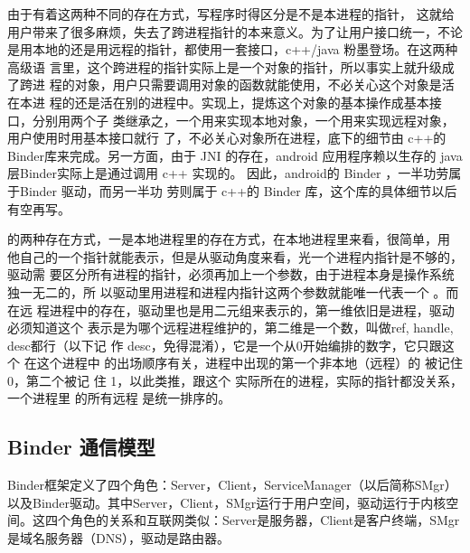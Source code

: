 \documentclass[a4paper,11pt]{article}
\begin{document}
由于\binder 有着这两种不同的存在方式，写程序时得区分\binder 是不是本进程的指针，
这就给用户带来了很多麻烦，失去了跨进程指针的本来意义。为了让用户接口统一，不论
是用本地的还是用远程的指针，都使用一套接口，c++/java 粉墨登场。在这两种高级语
言里，这个跨进程的指针实际上是一个对象的指针，所以\binder 事实上就升级成了跨进
程的对象，用户只需要调用对象的函数就能使用\binder ，不必关心这个对象是活在本进
程的还是活在别的进程中。实现上，提炼这个对象的基本操作成基本接口，分别用两个子
类继承之，一个用来实现本地对象，一个用来实现远程对象，用户使用时用基本接口就行
了，不必关心对象所在进程，底下的细节由 c++的Binder库来完成。另一方面，由于 JNI
的存在，android 应用程序赖以生存的 java 层Binder实际上是通过调用 c++ 实现的。
因此，android的 Binder ，一半功劳属于Binder 驱动\cite{BinderKernel}，而另一半功
劳则属于 c++的 Binder 库\cite{BinderLibrary}，这个库的具体细节以后有空再写。

\binder 的两种存在方式，一是本地进程里的存在方式，在本地进程里来看，很简单，用
他自己的一个指针就能表示，但是从驱动角度来看，光一个进程内指针是不够的，驱动需
要区分所有进程的指针，必须再加上一个参数，由于进程本身是操作系统独一无二的，所
以驱动里用进程和进程内指针这两个参数就能唯一代表一个 \binder。而 \binder 在远
程进程中的存在，驱动里也是用二元组来表示的，第一维依旧是进程，驱动必须知道这个
表示是为哪个远程进程维护的，第二维是一个数，叫做ref, handle, desc都行（以下记
作 desc，免得混淆），它是一个从0开始编排的数字，它只跟这个 \binder 在这个进程中
的出场顺序有关，进程中出现的第一个非本地（远程）的 \binder 被记住0，第二个被记
住 1，以此类推，跟这个 \binder 实际所在的进程，实际的指针都没关系，一个进程里
的所有远程 \binder 是统一排序的。


\subsection{ Binder 通信模型}
Binder框架定义了四个角色：Server，Client，ServiceManager（以后简称SMgr）以及Binder驱动。其中Server，Client，SMgr运行于用户空间，驱动运行于内核空间。这四个角色的关系和互联网类似：Server是服务器，Client是客户终端，SMgr是域名服务器（DNS），驱动是路由器。
\end{document}
